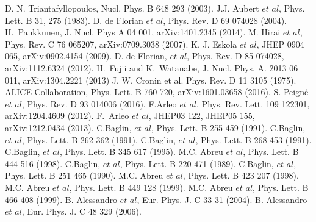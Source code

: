 \begin{thebibliography}{4}
 D. N. Triantafyllopoulos, Nucl. Phys. B 648 293 (2003).
 J.J. Aubert $et$ $al$, Phys. Lett. B 31, 275 (1983). 
 D. de Florian $et$ $al$, Phys. Rev. D 69 074028 (2004).
 H.~Paukkunen, J. Nucl. Phys A 04 001, arXiv:1401.2345 (2014).
 M. Hirai $et$ $al$, Phys. Rev. C 76 065207, arXiv:0709.3038  (2007).
  K. J. Eskola $et$ $al$, JHEP 0904 065, arXiv:0902.4154 (2009).
   D. de Florian, $et $ $al$, Phys. Rev. D 85 074028, arXiv:1112.6324 (2012).
 H.~Fujii and  K.~Watanabe, J. Nucl. Phys. A. 2013 06 011, arXiv:1304.2221 (2013)
 J. W. Cronin et al. Phys. Rev. D 11 3105 (1975).
 ALICE Collaboration, Phys. Lett. B 760 720, arXiv:1601.03658 (2016).
 S. Peigné $et$ $al$, Phys. Rev. D 93 014006 (2016).
 F.Arleo $et$ $al$, Phys. Rev. Lett. 109 122301, arXiv:1204.4609 (2012).
 F.~Arleo $et$ $al$, JHEP03 122, JHEP05 155, arXiv:1212.0434 (2013).
 C.Baglin, $et$ $al$, Phys. Lett. B 255 459 (1991).
 C.Baglin, $et$ $al$, Phys. Lett. B 262 362 (1991).
 C.Baglin, $et$ $al$, Phys. Lett. B 268 453 (1991).
 C.Baglin, $et$ $al$, Phys. Lett. B 345 617 (1995).
 M.C. Abreu $et$ $al$, Phys. Lett. B 444 516 (1998).
 C.Baglin, $et$ $al$, Phys. Lett. B 220 471 (1989).
 C.Baglin, $et$ $al$, Phys. Lett. B 251 465 (1990). 
M.C. Abreu $et$ $al$, Phys. Lett. B 423 207 (1998).
 M.C. Abreu $et$ $al$, Phys. Lett. B 449 128 (1999).
 M.C. Abreu $et$ $al$, Phys. Lett. B 466 408 (1999). 
 B. Alessandro $et$ $al$, Eur. Phys. J. C 33 31 (2004).
 B. Alessandro $et$ $al$, Eur. Phys. J. C 48 329 (2006).

\end{thebibliography}
